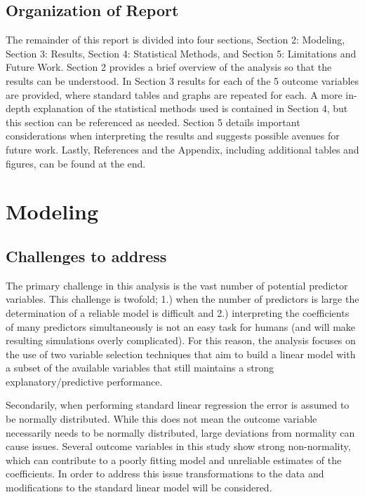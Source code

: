 \documentclass{article}
\begin{document}
\subsection{Organization of Report}

The remainder of this report is divided into four sections, Section 2: Modeling, Section 3: Results, Section 4: Statistical 
Methods, and Section 5: Limitations and Future Work. Section 2 provides a brief overview of the analysis so that the results can be understood. In Section 3 results for each of the 5 outcome variables are provided, where standard tables and graphs are repeated for each. A more in-depth explanation of the statistical methods used is contained in Section 4, but this section can be referenced as needed. Section 5 details important considerations when interpreting the results and suggests possible avenues for future work. Lastly, References and the Appendix, including additional tables and figures, can be found at the end.

\section{Modeling}
\subsection{Challenges to address}

The primary challenge in this analysis is the vast number of potential predictor variables. This challenge is twofold; 1.) when 
the number of predictors is large the determination of a reliable model is difficult and 2.) interpreting the coefficients of many 
predictors simultaneously is not an easy task for humans (and will make resulting simulations overly complicated). For this 
reason, the analysis focuses on the use of two variable selection techniques that aim to build a linear model with a subset of 
the available variables that still maintains a strong explanatory/predictive performance.

Secondarily, when performing standard linear regression the error is assumed to be normally distributed.  While this does not 
mean the outcome variable necessarily needs to be normally distributed, large deviations from normality can cause issues. 
Several outcome variables in this study show strong non-normality, which can contribute to a poorly fitting model and unreliable estimates of the coefficients. In order to address this issue transformations to the data and modifications to the standard linear model will be considered.
\end{document}
